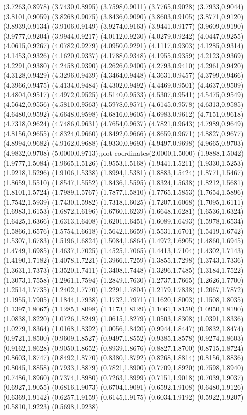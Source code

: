 {(3.7263,0.8978) (3.7430,0.8995) (3.7598,0.9011) (3.7765,0.9028) (3.7933,0.9044) (3.8101,0.9059) (3.8268,0.9075) (3.8436,0.9090) (3.8603,0.9105) (3.8771,0.9120) (3.8939,0.9134) (3.9106,0.9149) (3.9274,0.9163) (3.9441,0.9177) (3.9609,0.9190) (3.9777,0.9204) (3.9944,0.9217) (4.0112,0.9230) (4.0279,0.9242) (4.0447,0.9255) (4.0615,0.9267) (4.0782,0.9279) (4.0950,0.9291) (4.1117,0.9303) (4.1285,0.9314) (4.1453,0.9326) (4.1620,0.9337) (4.1788,0.9348) (4.1955,0.9359) (4.2123,0.9369) (4.2291,0.9380) (4.2458,0.9390) (4.2626,0.9400) (4.2793,0.9410) (4.2961,0.9420) (4.3128,0.9429) (4.3296,0.9439) (4.3464,0.9448) (4.3631,0.9457) (4.3799,0.9466) (4.3966,0.9475) (4.4134,0.9484) (4.4302,0.9492) (4.4469,0.9501) (4.4637,0.9509) (4.4804,0.9517) (4.4972,0.9525) (4.5140,0.9533) (4.5307,0.9541) (4.5475,0.9549) (4.5642,0.9556) (4.5810,0.9563) (4.5978,0.9571) (4.6145,0.9578) (4.6313,0.9585) (4.6480,0.9592) (4.6648,0.9598) (4.6816,0.9605) (4.6983,0.9612) (4.7151,0.9618) (4.7318,0.9624) (4.7486,0.9631) (4.7654,0.9637) (4.7821,0.9643) (4.7989,0.9649) (4.8156,0.9655) (4.8324,0.9660) (4.8492,0.9666) (4.8659,0.9671) (4.8827,0.9677) (4.8994,0.9682) (4.9162,0.9688) (4.9330,0.9693) (4.9497,0.9698) (4.9665,0.9703) (4.9832,0.9708) (5.0000,0.9713)};plot coordinates{(2.0000,1.5000) (1.9888,1.5042) (1.9777,1.5084) (1.9665,1.5126) (1.9553,1.5168) (1.9441,1.5211) (1.9330,1.5253) (1.9218,1.5296) (1.9106,1.5338) (1.8994,1.5381) (1.8883,1.5424) (1.8771,1.5467) (1.8659,1.5510) (1.8547,1.5552) (1.8436,1.5595) (1.8324,1.5638) (1.8212,1.5681) (1.8101,1.5724) (1.7989,1.5767) (1.7877,1.5810) (1.7765,1.5853) (1.7654,1.5896) (1.7542,1.5939) (1.7430,1.5982) (1.7318,1.6025) (1.7207,1.6068) (1.7095,1.6111) (1.6983,1.6153) (1.6872,1.6196) (1.6760,1.6239) (1.6648,1.6281) (1.6536,1.6324) (1.6425,1.6366) (1.6313,1.6408) (1.6201,1.6451) (1.6089,1.6493) (1.5978,1.6534) (1.5866,1.6576) (1.5754,1.6618) (1.5642,1.6659) (1.5531,1.6701) (1.5419,1.6742) (1.5307,1.6783) (1.5196,1.6824) (1.5084,1.6864) (1.4972,1.6905) (1.4860,1.6945) (1.4749,1.6985) (1.4637,1.7025) (1.4525,1.7065) (1.4413,1.7104) (1.4302,1.7143) (1.4190,1.7182) (1.4078,1.7221) (1.3966,1.7259) (1.3855,1.7298) (1.3743,1.7336) (1.3631,1.7373) (1.3520,1.7411) (1.3408,1.7448) (1.3296,1.7485) (1.3184,1.7522) (1.3073,1.7558) (1.2961,1.7594) (1.2849,1.7630) (1.2737,1.7665) (1.2626,1.7700) (1.2514,1.7735) (1.2402,1.7770) (1.2291,1.7804) (1.2179,1.7838) (1.2067,1.7872) (1.1955,1.7905) (1.1844,1.7938) (1.1732,1.7971) (1.1620,1.8003) (1.1508,1.8035) (1.1397,1.8067) (1.1285,1.8098) (1.1173,1.8129) (1.1061,1.8159) (1.0950,1.8190) (1.0838,1.8220) (1.0726,1.8249) (1.0615,1.8279) (1.0503,1.8308) (1.0391,1.8336) (1.0279,1.8364) (1.0168,1.8392) (1.0056,1.8420) (0.9944,1.8447) (0.9832,1.8474) (0.9721,1.8500) (0.9609,1.8527) (0.9497,1.8552) (0.9385,1.8578) (0.9274,1.8603) (0.9162,1.8628) (0.9050,1.8652) (0.8939,1.8676) (0.8827,1.8700) (0.8715,1.8724) (0.8603,1.8747) (0.8492,1.8770) (0.8380,1.8792) (0.8268,1.8814) (0.8156,1.8836) (0.8045,1.8858) (0.7933,1.8879) (0.7821,1.8900) (0.7709,1.8920) (0.7598,1.8940) (0.7486,1.8960) (0.7374,1.8980) (0.7263,1.8999) (0.7151,1.9018) (0.7039,1.9037) (0.6927,1.9055) (0.6816,1.9073) (0.6704,1.9091) (0.6592,1.9108) (0.6480,1.9126) (0.6369,1.9142) (0.6257,1.9159) (0.6145,1.9175) (0.6034,1.9192) (0.5922,1.9207) (0.5810,1.9223) (0.5698,1.9238) }
